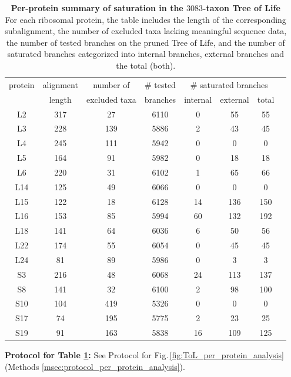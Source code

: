 \begin{appendices}
\begin{table}[ht]
     \centering 
    \begin{tabular}{|c|c|c|c|c|c|c|c|}
      \hline
       protein & alignment & number of & \# tested  &\multicolumn{3}{c|}{\# saturated branches}\\
& length & excluded taxa &branches& internal & external & total\\
\hline
L2  & 317 &  27 & 6110 &  0 &  55 &  55\\
L3  & 228 & 139 & 5886 &  2 &  43 &  45\\
L4  & 245 & 111 & 5942 &  0 &   0 &   0\\
L5  & 164 &  91 & 5982 &  0 &  18 &  18\\
L6  & 220 &  31 & 6102 &  1 &  65 &  66\\
L14 & 125 &  49 & 6066 &  0 &   0 &   0\\
L15 & 122 &  18 & 6128 & 14 & 136 & 150\\
L16 & 153 &  85 & 5994 & 60 & 132 & 192\\
L18 & 141 &  64 & 6036 &  6 &  50 &  56\\
L22 & 174 &  55 & 6054 &  0 &  45 &  45\\
L24 &  81 &  89 & 5986 &  0 &   3 &   3\\
S3  & 216 &  48 & 6068 & 24 & 113 & 137\\
S8  & 141 &  32 & 6100 &  2 &  98 & 100\\
S10 & 104 & 419 & 5326 &  0 &   0 &   0\\
S17 &  74 & 195 & 5775 &  2 &  23 &  25\\
S19 &  91 & 163 & 5838 & 16 & 109 & 125\\
\hline
     \end{tabular}
     \vspace{0.25cm}
     \caption{ \textbf{Per-protein summary of saturation in the $3083$-taxon Tree of Life} For each ribosomal protein, the table includes the length of the corresponding subalignment, the number of excluded taxa lacking meaningful sequence data, the number of tested branches on the pruned Tree of Life, and the number of saturated branches  categorized into internal branches, external branches and the total (both).}
	\label{table:per_protein_summary}
    \end{table}

\medskip

\noindent \textbf{Protocol for Table \ref{table:per_protein_summary}:} See Protocol for Fig.\,\ref{fig:ToL_per_protein_analysis} (Methods  \ref{msec:protocol_per_protein_analysis}).
\medskip


\end{appendices}
